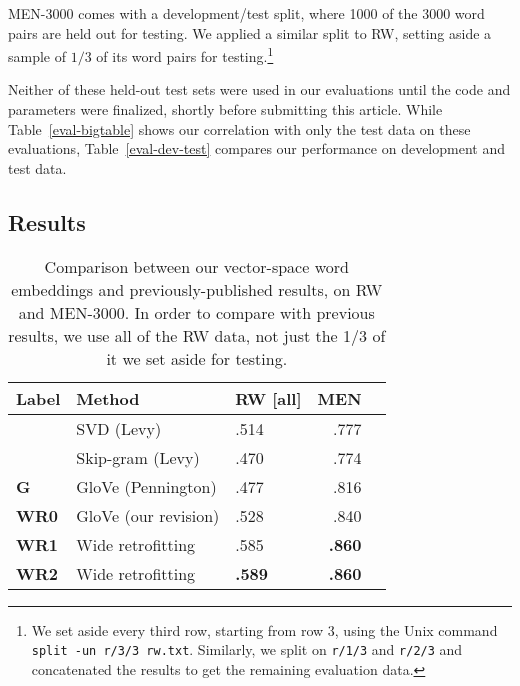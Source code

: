\documentclass[11pt]{article}
\begin{document}
MEN-3000 comes with a development/test split, where 1000 of the 3000 word pairs
are held out for testing. We applied a similar split to RW, setting aside a
sample of $1/3$ of its word pairs for testing.\footnote{
    We set aside every third row, starting from row 3, using the Unix command
    {\tt split -un r/3/3 rw.txt}. Similarly, we split on {\tt r/1/3} and
    {\tt r/2/3} and concatenated the results to get the remaining evaluation
    data.
}

Neither of these held-out test sets were used in our evaluations until the code
and parameters were finalized, shortly before submitting this article. While
Table~\ref{eval-bigtable} shows our correlation with only the test data on these
evaluations, Table~\ref{eval-dev-test} compares our performance on development
and test data.

\subsection{Results}

\begin{table}[t]
\centering
\begin{tabular}{lllrr}
\toprule
Label     & Method                 & RW [all] &      MEN \\
\midrule
          & SVD (Levy)             &     .514 &     .777 \\
          & Skip-gram (Levy)       &     .470 &     .774 \\
\bf G     & GloVe (Pennington)     &     .477 &     .816 \\
\bf WR0   & GloVe (our revision)   &     .528 &     .840 \\
\bf WR1   & Wide retrofitting      &     .585 &{\bf .860}\\
\bf WR2   & Wide retrofitting      &{\bf .589}&{\bf .860}\\
\bottomrule
\end{tabular}

\caption{
    Comparison between our vector-space word embeddings and previously-published
    results, on RW and MEN-3000. In order to compare with previous results, we
    use all of the RW data, not just the 1/3 of it we set aside for testing.
}
\label{compare-others}
\end{table}
\end{document}
